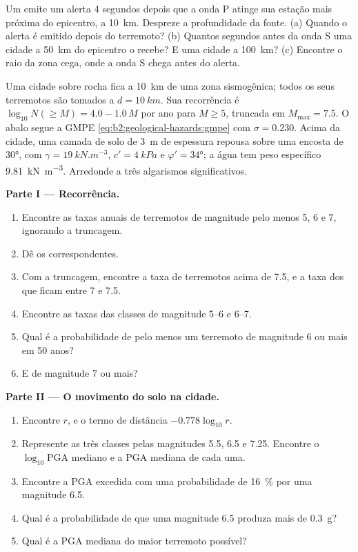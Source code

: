 \begin{exercise}[$\star\star\star$]\label{exo:b2:geological-hazards:12}
Um  emite um alerta 4 segundos depois que a onda P atinge sua estação
mais próxima do epicentro, a \qty{10}{km}. Despreze a profundidade da fonte. (a) Quando o
alerta é emitido depois do terremoto? (b) Quantos segundos antes da onda S uma cidade a \qty{50}{km}
do epicentro o recebe? E uma cidade a \qty{100}{km}? (c) Encontre o raio da zona cega, onde
a onda S chega antes do alerta.
\end{exercise}

\begin{problem}\label{pb:b2:geological-hazards:1}
Uma cidade sobre rocha fica a \qty{10}{km} de uma zona sismogênica; todos os seus terremotos são tomados a
$d = \qty{10}{km}$. Sua recorrência é $\log_{10} N(\geq M) = 4.0 - 1.0\,M$ por ano para $M \geq 5$,
truncada em $M_{\max} = 7.5$. O abalo segue a GMPE \eqref{eq:b2:geological-hazards:gmpe}
com $\sigma = 0.230$. Acima da cidade, uma camada de solo de \qty{3}{m} de espessura repousa sobre uma encosta de \ang{30},
com $\gamma = \qty{19}{kN.m^{-3}}$, $c' = \qty{4}{kPa}$ e $\varphi' = \ang{34}$; a água tem peso
específico \qty{9.81}{kN.m^{-3}}. Arredonde a três algarismos significativos.

\noindent\textbf{Parte I --- Recorrência.}
\begin{enumerate}
  \item Encontre as taxas anuais de terremotos de magnitude pelo menos 5, 6 e 7, ignorando a
        truncagem.
  \item Dê os  correspondentes.
  \item Com a truncagem, encontre a taxa de terremotos acima de 7.5, e a taxa dos que ficam entre 7
        e 7.5.
  \item Encontre as taxas das classes de magnitude 5--6 e 6--7.
  \item Qual é a probabilidade de pelo menos um terremoto de magnitude 6 ou mais em 50 anos?
  \item E de magnitude 7 ou mais?
\end{enumerate}

\noindent\textbf{Parte II --- O movimento do solo na cidade.}
\begin{enumerate}[resume]
  \item Encontre $r$, e o termo de distância $-0.778\log_{10} r$.
  \item Represente as três classes pelas magnitudes 5.5, 6.5 e 7.25. Encontre o
        $\log_{10}\mathrm{PGA}$ mediano e a PGA mediana de cada uma.
  \item Encontre a PGA excedida com uma probabilidade de \qty{16}{\percent} por uma magnitude 6.5.
  \item Qual é a probabilidade de que uma magnitude 6.5 produza mais de \qty{0.3}{g}?
  \item Qual é a PGA mediana do maior terremoto possível?
\end{enumerate}


\end{problem}
